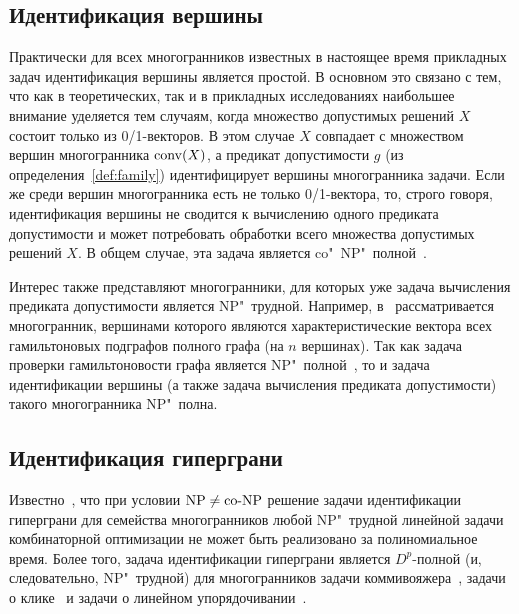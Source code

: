 \subsection{Идентификация вершины}

Практически для всех многогранников известных в настоящее время прикладных задач идентификация вершины является простой.
В основном это связано с тем, что как в теоретических, так и в прикладных исследованиях наибольшее внимание уделяется тем случаям, когда множество допустимых решений $X$ состоит только из 0/1-векторов.
В этом случае $X$ совпадает с множеством вершин многогранника $\operatorname{conv}(X)$, а предикат допустимости $g$ (из определения~\ref{def:family}) идентифицирует вершины многогранника задачи.
Если же среди вершин многогранника есть не только 0/1-вектора, то, строго говоря, идентификация вершины не сводится к вычислению одного предиката допустимости и может потребовать обработки всего множества допустимых решений $X$. В общем случае, эта задача является co"~NP"~полной~\cite[Theorem 18.5]{Schrijver:1998}.

Интерес также представляют многогранники,
для которых уже задача вычисления предиката допустимости является NP"~трудной.
Например, в~\cite{Yannakakis:1991} рассматривается многогранник, вершинами которого являются характеристические вектора всех гамильтоновых подграфов полного графа (на $n$ вершинах).
Так как задача проверки гамильтоновости графа является NP"~полной~\cite{Karp:1972}, то и задача идентификации вершины (а также задача вычисления предиката допустимости) такого многогранника NP"~полна.

\subsection{Идентификация гиперграни}
\label{subsec:IdentFacet}

Известно~\cite{SchrijverCO:2003}, что при условии $\textup{NP} \ne \textup{co-NP}$ решение задачи идентификации гиперграни для семейства многогранников любой NP"~трудной линейной задачи комбинаторной оптимизации не может быть реализовано за полиномиальное время.
Более того, задача идентификации гиперграни
является $D^p$-полной (и, следовательно, NP"~трудной)
для многогранников задачи коммивояжера~\cite{PapadimitriouW:1988}, задачи о клике~\cite{PapadimitriouY:1984} и задачи о линейном упорядочивании~\cite{Fiorini:2006}.

\begin{comment}
С задачей идентификации гиперграни тесно связана задача \emph{идентификации опорной гиперплоскости}:
для данных $\bm{a}\in\Z^d$ и $b \in \Z$ проверить,
является ли гиперплоскость $H(\bm{a}, b)$ опорной для данного многогранника $P$.
Известно, что эта задача $D^p$-полна для многогранников задачи коммивояжера и задачи о клике ~\cite{PapadimitriouY:1984}.
А для многогранника задачи о рюкзаке доказана co"~NP"~полнота идентификации допустимого неравенства~\cite{Hartvigsen:1992}.
\end{comment}

